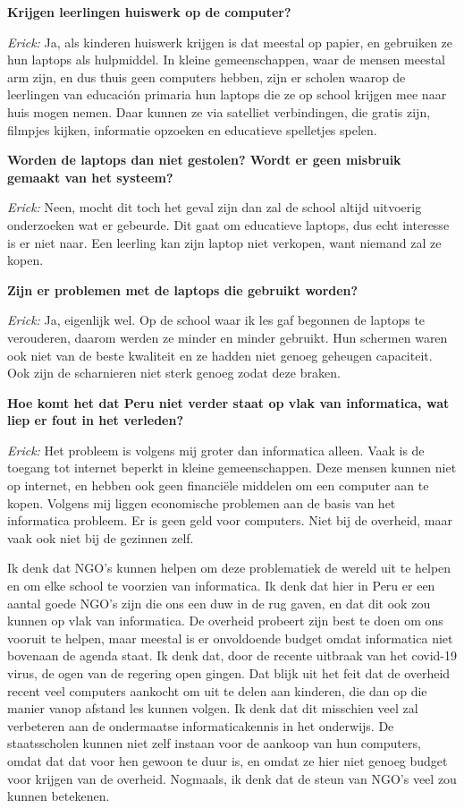 \textbf{Krijgen leerlingen huiswerk op de computer?}

\textit{Erick:} Ja, als kinderen huiswerk krijgen is dat meestal op papier, en gebruiken ze hun laptops als hulpmiddel. In kleine gemeenschappen, waar de mensen meestal arm zijn, en dus thuis geen computers hebben, zijn er scholen waarop de leerlingen van educación primaria hun laptops die ze op school krijgen mee naar huis mogen nemen. Daar kunnen ze via satelliet verbindingen, die gratis zijn, filmpjes kijken, informatie opzoeken en educatieve spelletjes spelen. 

\textbf{Worden de laptops dan niet gestolen? Wordt er geen misbruik gemaakt van het systeem?}

\textit{Erick:} Neen, mocht dit toch het geval zijn dan zal de school altijd uitvoerig onderzoeken wat er gebeurde. Dit gaat om educatieve laptops, dus echt interesse is er niet naar. Een leerling kan zijn laptop niet verkopen, want niemand zal ze kopen. 

\textbf{Zijn er problemen met de laptops die gebruikt worden?}

\textit{Erick:} Ja, eigenlijk wel. Op de school waar ik les gaf begonnen de laptops te verouderen, daarom werden ze minder en minder gebruikt. Hun schermen waren ook niet van de beste kwaliteit en ze hadden niet genoeg geheugen capaciteit. Ook zijn de scharnieren niet sterk genoeg zodat deze braken.

\textbf{Hoe komt het dat Peru niet verder staat op vlak van informatica, wat liep er fout in het verleden?}

\textit{Erick:} Het probleem is volgens mij groter dan informatica alleen. Vaak is de toegang tot internet beperkt in kleine gemeenschappen. Deze mensen kunnen niet op internet, en hebben ook geen financiële middelen om een computer aan te kopen. Volgens mij liggen economische problemen aan de basis van het informatica probleem. Er is geen geld voor computers. Niet bij de overheid, maar vaak ook niet bij de gezinnen zelf. 

Ik denk dat NGO's kunnen helpen om deze problematiek de wereld uit te helpen en om elke school te voorzien van informatica. Ik denk dat hier in Peru er een aantal goede NGO's zijn die ons een duw in de rug gaven, en dat dit ook zou kunnen op vlak van informatica. De overheid probeert zijn best te doen om ons vooruit te helpen, maar meestal is er onvoldoende budget omdat informatica niet bovenaan de agenda staat. Ik denk dat, door de recente uitbraak van het covid-19 virus, de ogen van de regering open gingen. Dat blijk uit het feit dat de overheid recent veel computers aankocht om uit te delen aan kinderen, die dan op die manier vanop afstand les kunnen volgen. Ik denk dat dit misschien veel zal verbeteren aan de ondermaatse informaticakennis in het onderwijs. De staatsscholen kunnen niet zelf instaan voor de aankoop van hun computers, omdat dat dat voor hen gewoon te duur is, en omdat ze hier niet genoeg budget voor krijgen van de overheid. Nogmaals, ik denk dat de steun van NGO's veel zou kunnen betekenen.

